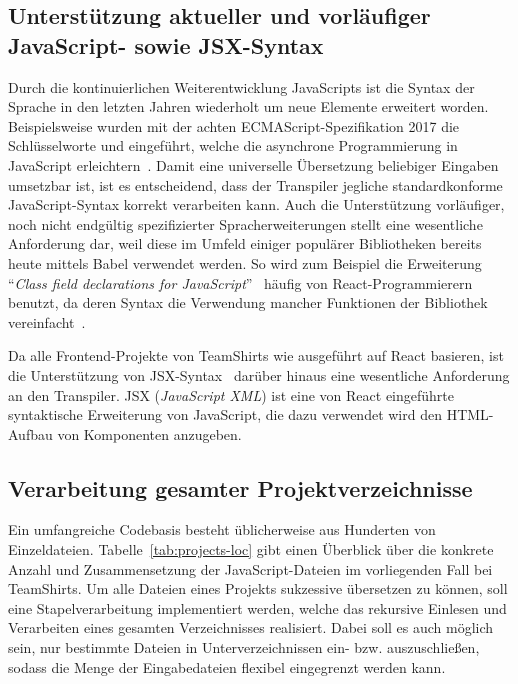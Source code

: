 \subsection{Unterstützung aktueller und vorläufiger JavaScript- sowie JSX-Syntax}
\label{sec:requirement:syntax}

Durch die kontinuierlichen Weiterentwicklung JavaScripts ist die Syntax der Sprache in den letzten Jahren wiederholt um neue Elemente erweitert worden. Beispielsweise wurden mit der achten ECMAScript-Spezifikation 2017 die Schlüsselworte  und  eingeführt, welche die asynchrone Programmierung in JavaScript erleichtern~\autocite[430]{ECMASCRIPT:2017}. Damit eine universelle Übersetzung beliebiger Eingaben umsetzbar ist, ist es entscheidend, dass der Transpiler jegliche standardkonforme JavaScript-Syntax korrekt verarbeiten kann. Auch die Unterstützung vorläufiger, noch nicht endgültig spezifizierter Spracherweiterungen stellt eine wesentliche Anforderung dar, weil diese im Umfeld einiger populärer Bibliotheken bereits heute mittels Babel verwendet werden. So wird zum Beispiel die Erweiterung \enquote{\textit{Class field declarations for JavaScript}}~\autocite{ES_PROPOSAL:CLASS_FIELDS} häufig von React-Programmierern benutzt, da deren Syntax die Verwendung mancher Funktionen der Bibliothek vereinfacht~\autocite{REACT:HANDLING_EVENTS}.

Da alle Frontend-Projekte von TeamShirts wie ausgeführt auf React basieren, ist die Unterstützung von JSX-Syntax~\autocite{SOFTWARE:JSX} darüber hinaus eine wesentliche Anforderung an den Transpiler. JSX (\textit{JavaScript XML}) ist eine von React eingeführte syntaktische Erweiterung von JavaScript, die dazu verwendet wird den HTML-Aufbau von Komponenten anzugeben.

\subsection{Verarbeitung gesamter Projektverzeichnisse}
\label{sec:requirement:batch-processing}

Ein umfangreiche Codebasis besteht üblicherweise aus Hunderten von Einzeldateien. Tabelle~\ref{tab:projects-loc} gibt einen Überblick über die konkrete Anzahl und Zusammensetzung der JavaScript-Dateien im vorliegenden Fall bei TeamShirts. Um alle Dateien eines Projekts sukzessive übersetzen zu können, soll eine Stapelverarbeitung implementiert werden, welche das rekursive Einlesen und Verarbeiten eines gesamten Verzeichnisses realisiert. Dabei soll es auch möglich sein, nur bestimmte Dateien in Unterverzeichnissen ein- bzw. auszuschließen, sodass die Menge der Eingabedateien flexibel eingegrenzt werden kann.

